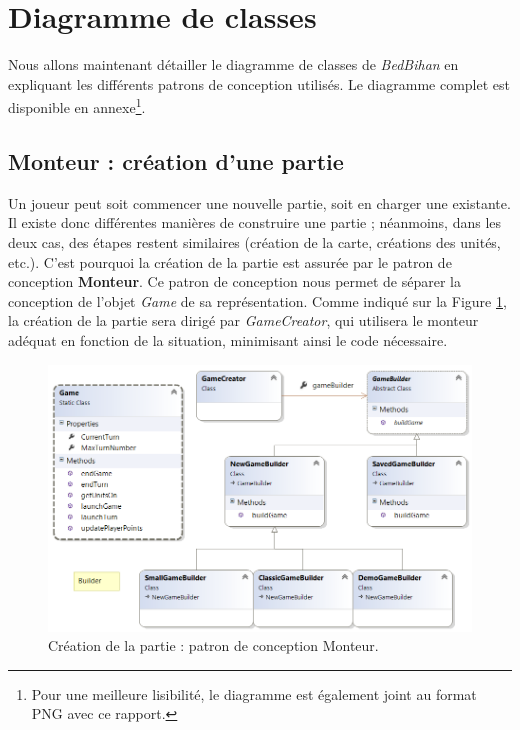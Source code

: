 \newpage
\section{Diagramme de classes}

	Nous allons maintenant détailler le diagramme de classes de \emph{BedBihan} en expliquant les différents patrons de conception utilisés. Le diagramme complet est disponible en annexe\footnote{Pour une meilleure lisibilité, le diagramme est également joint au format PNG avec ce rapport.}.


	\subsection{Monteur : création d'une partie}

		Un joueur peut soit commencer une nouvelle partie, soit en charger une existante. Il existe donc différentes manières de construire une partie ; néanmoins, dans les deux cas, des étapes restent similaires (création de la carte, créations des unités, etc.). C'est pourquoi la création de la partie est assurée par le patron de conception \textbf{Monteur}. Ce patron de conception nous permet de séparer la conception de l'objet \emph{Game} de sa représentation. Comme indiqué sur la {\sc Figure} \ref{fig:builder}, la création de la partie sera dirigé par \emph{GameCreator}, qui utilisera le monteur adéquat en fonction de la situation, minimisant ainsi le code nécessaire.
		
	\begin{figure}[h]
		\begin{center}
			\includegraphics[width=1\textwidth]{figure/builder.png}
		\end{center}
		\caption{Création de la partie : patron de conception Monteur.}
		\label{fig:builder}
	\end{figure}


